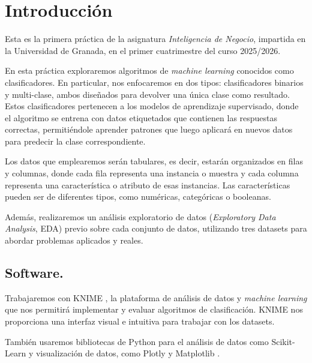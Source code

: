 \section{Introducción}

Esta es la primera práctica de la asignatura \textit{Inteligencia de Negocio}, impartida en la Universidad de Granada, en el primer cuatrimestre del curso 2025/2026.

En esta práctica exploraremos algoritmos de \textit{machine learning} conocidos como clasificadores. En particular, nos enfocaremos en dos tipos: clasificadores binarios y multi-clase, ambos diseñados para devolver una única clase como resultado. Estos clasificadores pertenecen a los modelos de aprendizaje supervisado, donde el algoritmo se entrena con datos etiquetados que contienen las respuestas correctas, permitiéndole aprender patrones que luego aplicará en nuevos datos para predecir la clase correspondiente.

Los datos que emplearemos serán tabulares, es decir, estarán organizados en filas y columnas, donde cada fila representa una instancia o muestra y cada columna representa una característica o atributo de esas instancias. Las características pueden ser de diferentes tipos, como numéricas, categóricas o booleanas.

Además, realizaremos un análisis exploratorio de datos (\textit{Exploratory Data Analysis}, EDA) previo sobre cada conjunto de datos, utilizando tres datasets para abordar problemas aplicados y reales.


\subsection{Software.}

Trabajaremos con KNIME \cite{berthold2009knime}, la plataforma de análisis de datos y \textit{machine learning} que nos permitirá implementar y evaluar algoritmos de clasificación.
KNIME nos proporciona una interfaz visual e intuitiva para trabajar con los datasets.

También usaremos bibliotecas de Python para el análisis de datos como Scikit-Learn \cite{fabian2011scikit} y visualización de datos, como Plotly \cite{plotly} y Matplotlib \cite{hunter2007matplotlib}.


